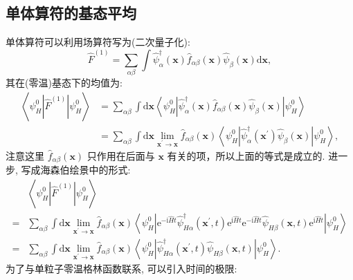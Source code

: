 \subsection{单体算符的基态平均}
单体算符可以利用场算符写为(二次量子化):
\begin{equation}
\hat{F}^{(1)}=\sum_{\alpha \beta} \int \hat{\psi}_{\alpha}^{\dagger}(\boldsymbol{x}) \hat{f}^{}_{\alpha \beta}(\boldsymbol{x}) \hat{\psi}^{}_{\beta}(\boldsymbol{x}) \mathrm{d} \boldsymbol{x} ,
\end{equation}
其在(零温)基态下的均值为:
\begin{align}
\left\langle\psi_{H}^{0}\left|\hat{F}^{(1)}\right| \psi_{H}^{0}\right\rangle &=\sum_{\alpha \beta} \int \mathrm{d} \boldsymbol{x}\left\langle\psi_{H}^{0}\left|\hat{\psi}_{\alpha}^{\dagger}(\boldsymbol{x}) \hat{f}^{}_{\alpha \beta}(\boldsymbol{x}) \hat{\psi}^{}_{\beta}(\boldsymbol{x})\right| \psi_{H}^{0}\right\rangle\nonumber \\
&=\sum_{\alpha \beta} \int \mathrm{d} \boldsymbol{x} \lim _{\boldsymbol{x}^{\prime} \rightarrow \boldsymbol{x}} \hat{f}_{\alpha \beta}(\boldsymbol{x})\left\langle\psi_{H}^{0}\left|\hat{\psi}_{\alpha}^{\dagger}\left(\boldsymbol{x}^{\prime}\right) \hat{\psi}^{}_{\beta}(\boldsymbol{x})\right| \psi_{H}^{0}\right\rangle ,
\end{align}
注意这里 $\hat{f}_{\alpha \beta}(\boldsymbol{x})$ 只作用在后面与 $\boldsymbol{x}$ 有关的项，所以上面的等式是成立的. 进一步, 写成海森伯绘景中的形式:
\begin{align}
&\left\langle\psi_{H}^{0}\left|\hat{F}^{(1)}\right| \psi_{H}^{0}\right\rangle\nonumber\\
=&\sum_{\alpha \beta} \int \mathrm{d} \boldsymbol{x} \lim _{\boldsymbol{x}^{\prime} \rightarrow \boldsymbol{x}} \hat{f}_{\alpha \beta}(\boldsymbol{x})\left\langle\psi_{H}^{0}\left| \mathrm{e}^{-\mathrm{i} \hat{H} t} \hat{\psi}_{H \alpha}^{\dagger}\left(\boldsymbol{x}^{\prime},t\right)\mathrm{e}^{\mathrm{i} \hat{H} t} \mathrm{e}^{-\mathrm{i} \hat{H} t} \hat{\psi}^{}_{H \beta}(\boldsymbol{x},t) \mathrm{e}^{\mathrm{i} \hat{H} t} \right| \psi_{H}^{0}\right\rangle\nonumber\\
=&\sum_{\alpha \beta} \int \mathrm{d} \boldsymbol{x} \lim _{\boldsymbol{x}^{\prime} \rightarrow \boldsymbol{x}} \hat{f}_{\alpha \beta}(\boldsymbol{x})\left\langle\psi_{H}^{0}\left|\hat{\psi}_{H \alpha}^{\dagger}\left(\boldsymbol{x}^{\prime}, t\right) \hat{\psi}^{}_{H \beta}(\boldsymbol{x}, t)\right| \psi_{H}^{0}\right\rangle .
\end{align}
为了与单粒子零温格林函数联系, 可以引入时间的极限:
